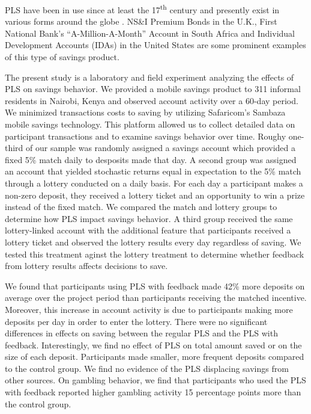 \documentclass[12pt]{article}
\begin{document}

	PLS have been in use since at least the 17\textsuperscript{th} century and presently exist in various forms around the globe . NS\&I Premium Bonds in the U.K., First National Bank's ``A-Million-A-Month'' Account in South Africa and Individual Development Accounts (IDAs) in the United States are some prominent examples of this type of savings product.


	The present study is a laboratory and field experiment analyzing the effects of PLS on savings behavior. We provided a mobile savings product to 311 informal residents in Nairobi, Kenya and observed account activity over a 60-day period. We minimized transactions costs to saving by utilizing Safaricom's Sambaza mobile savings technology. This platform allowed us to collect detailed data on participant transactions and to examine savings behavior over time. Roughy one-third of our sample was randomly assigned a savings account which provided a fixed 5\% match daily to desposits made that day. A second group was assigned an account that yielded stochastic returns equal in expectation to the 5\% match through a lottery conducted on a daily basis. For each day a participant makes a non-zero deposit, they received a lottery ticket and an opportunity to win a prize instead of the fixed match. We compared the match and lottery groups to determine how PLS impact savings behavior. A third group received the same lottery-linked account with the additional feature that participants received a lottery ticket and observed the lottery results every day regardless of saving. We tested this treatment aginst the lottery treatment to determine whether feedback from lottery results affects decisions to save.


	We found that participants using PLS with feedback made 42\% more deposits on average over the project period than participants receiving the matched incentive. Moreover, this increase in account activity is due to participants making more deposits per day in order to enter the lottery. There were no significant differences in effects on saving between the regular PLS and the PLS with feedback. Interestingly, we find no effect of PLS on total amount saved or on the size of each deposit. Participants made smaller, more frequent deposits compared to the control group. We find no evidence of the PLS displacing savings from other sources. On gambling behavior, we find that participants who used the PLS with feedback reported higher gambling activity 15 percentage points more than the control group.
\end{document}
